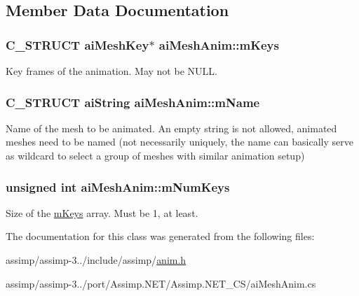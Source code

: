 \subsection{Member Data Documentation}
\hypertarget{structai_mesh_anim_abc78e9f6d7583c541447e8c389488f1b}{
\subsubsection[{m\+Keys}]{\setlength{\rightskip}{0pt plus 5cm}C\+\_\+\+S\+T\+R\+U\+C\+T {\bf ai\+Mesh\+Key}$\ast$ ai\+Mesh\+Anim\+::m\+Keys}}\label{structai_mesh_anim_abc78e9f6d7583c541447e8c389488f1b}
Key frames of the animation. May not be N\+U\+L\+L. \hypertarget{structai_mesh_anim_a20751a739377fdba514c676ef4bda4c7}{
\subsubsection[{m\+Name}]{\setlength{\rightskip}{0pt plus 5cm}C\+\_\+\+S\+T\+R\+U\+C\+T {\bf ai\+String} ai\+Mesh\+Anim\+::m\+Name}}\label{structai_mesh_anim_a20751a739377fdba514c676ef4bda4c7}
Name of the mesh to be animated. An empty string is not allowed, animated meshes need to be named (not necessarily uniquely, the name can basically serve as wildcard to select a group of meshes with similar animation setup) \hypertarget{structai_mesh_anim_aa8702d42bf619ccc8414a556f41634d8}{
\subsubsection[{m\+Num\+Keys}]{\setlength{\rightskip}{0pt plus 5cm}unsigned int ai\+Mesh\+Anim\+::m\+Num\+Keys}}\label{structai_mesh_anim_aa8702d42bf619ccc8414a556f41634d8}
Size of the \hyperlink{structai_mesh_anim_abc78e9f6d7583c541447e8c389488f1b}{m\+Keys} array. Must be 1, at least. 

The documentation for this class was generated from the following files\+:\begin{DoxyCompactItemize}
\item 
assimp/assimp-\/3../include/assimp/\hyperlink{anim_8h}{anim.\+h}\item 
assimp/assimp-\/3../port/\+Assimp.\+N\+E\+T/\+Assimp.\+N\+E\+T\+\_\+\+C\+S/ai\+Mesh\+Anim.\+cs\end{DoxyCompactItemize}
